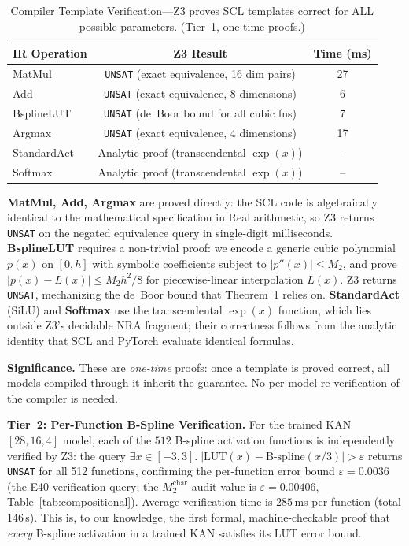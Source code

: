 \documentclass[journal,onecolumn]{IEEEtran}
\begin{document}
\begin{table}[ht]
\centering
\caption{Compiler Template Verification---Z3 proves SCL templates correct for
        ALL possible parameters. (Tier~1, one-time proofs.)}
\label{tab:template_verify}
\begin{tabular}{@{}lcc@{}}
\toprule
\textbf{IR Operation} & \textbf{Z3 Result} & \textbf{Time (ms)} \\
\midrule
 MatMul      & \texttt{UNSAT} (exact equivalence, 16 dim pairs)     & 27 \\
 Add         & \texttt{UNSAT} (exact equivalence, 8 dimensions)     &  6 \\
 BsplineLUT  & \texttt{UNSAT} (de~Boor bound for all cubic fns)     &  7 \\
 Argmax      & \texttt{UNSAT} (exact equivalence, 4 dimensions)     & 17 \\
 StandardAct & Analytic proof (transcendental $\exp(x)$)            & -- \\
 Softmax     & Analytic proof (transcendental $\exp(x)$)            & -- \\
\bottomrule
\end{tabular}
\end{table}

\textbf{MatMul, Add, Argmax} are proved directly: the SCL code is
algebraically identical to the mathematical specification in Real
arithmetic, so Z3 returns \texttt{UNSAT} on the negated equivalence
query in single-digit milliseconds. \textbf{BsplineLUT} requires a
non-trivial proof: we encode a generic cubic polynomial $p(x)$ on
$[0,h]$ with symbolic coefficients subject to $|p''(x)|\leq M_2$, and
prove $|p(x) - L(x)| \leq M_2 h^2/8$ for piecewise-linear interpolation
$L(x)$. Z3 returns \texttt{UNSAT}, mechanizing the de~Boor bound that
Theorem~1 relies on. \textbf{StandardAct} (SiLU) and \textbf{Softmax}
use the transcendental $\exp(x)$ function, which lies outside Z3's
decidable NRA fragment; their correctness follows from the analytic
identity that SCL and PyTorch evaluate identical formulas.

\textbf{Significance.} These are \textit{one-time} proofs: once a
template is proved correct, all models compiled through it inherit
the guarantee. No per-model re-verification of the compiler is needed.

\vspace{4pt}
\noindent\textbf{Tier~2: Per-Function B-Spline Verification.}
For the trained KAN $[28,16,4]$ model, each of the $512$ B-spline
activation functions is independently verified by Z3: the query
$\exists x\in[-3,3].\;|\text{LUT}(x) - \text{B-spline}(x/3)| >
\varepsilon$ returns \texttt{UNSAT} for all 512 functions,
confirming the per-function error bound $\varepsilon = 0.0036$ (the E40
verification query; the $M_2^{\text{char}}$ audit value is $\varepsilon =
0.00406$, Table~\ref{tab:compositional}).
Average verification time is $285$\,ms per function (total 146\,s).
This is, to our knowledge, the first formal, machine-checkable proof that \textit{every}
B-spline activation in a trained KAN satisfies its LUT error bound.
\end{document}
